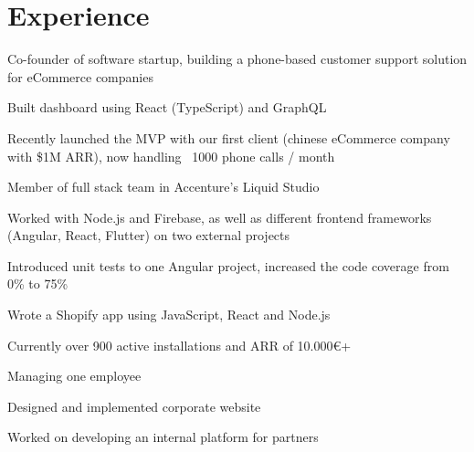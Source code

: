 \documentclass[]{florian_mueller_cv}
\begin{document}
\begin{minipage}[t]{0.66\textwidth} 


\section{Experience}

\vspace{\topsep} %
\begin{tightemize}\item Co-founder of software startup, building a phone-based customer support solution for eCommerce companies \item Built dashboard using React (TypeScript) and GraphQL \item Recently launched the MVP with our first client (chinese eCommerce company with \$1M ARR), now handling ~1000 phone calls / month
\end{tightemize}
\sectionsep

\begin{tightemize}\item Member of full stack team in Accenture's Liquid Studio \item Worked with Node.js and Firebase, as well as different frontend frameworks (Angular, React, Flutter) on two external projects \item Introduced unit tests to one Angular project, increased the code coverage from 0\% to 75\%
\end{tightemize}
\sectionsep

\begin{tightemize}
\item Wrote a Shopify app using JavaScript, React and Node.js\item Currently over 900 active installations and ARR of 10.000€+ \item Managing one employee\end{tightemize}
\sectionsep

\begin{tightemize}
\item Designed and implemented corporate website \item Worked on developing an internal platform for partners \end{tightemize}



\end{minipage}
\end{document}
